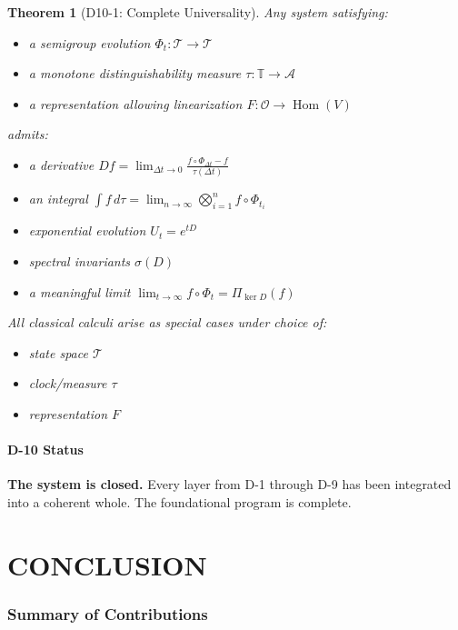 \documentclass[12pt, oneside]{article}
\newtheorem{theorem}{Theorem}[section]
\DeclareMathOperator{\Hom}{Hom}
\newcommand{\A}{\mathcal{A}}
\newcommand{\T}{\mathcal{T}}
\newcommand{\Opr}{\mathcal{O}}
\begin{document}
\begin{theorem}[D10-1: Complete Universality]
Any system satisfying:
\begin{itemize}
    \item a semigroup evolution $\Phi_t: \T \rightarrow \T$
    \item a monotone distinguishability measure $\tau: \mathbb{T} \rightarrow \A$
    \item a representation allowing linearization $F: \Opr \rightarrow \Hom(V)$
\end{itemize}
admits:
\begin{itemize}
    \item a derivative $Df = \lim_{\Delta t \rightarrow 0} \frac{f \circ \Phi_{\Delta t} - f}{\tau(\Delta t)}$
    \item an integral $\int f \, d\tau = \lim_{n \rightarrow \infty} \bigotimes_{i=1}^n f \circ \Phi_{t_i}$
    \item exponential evolution $U_t = e^{tD}$
    \item spectral invariants $\sigma(D)$
    \item a meaningful limit $\lim_{t \rightarrow \infty} f \circ \Phi_t = \Pi_{\ker D}(f)$
\end{itemize}

All classical calculi arise as special cases under choice of:
\begin{itemize}
    \item state space $\T$
    \item clock/measure $\tau$
    \item representation $F$
\end{itemize}
\end{theorem}

\subsection{D-10 Status}

\textbf{The system is closed.} Every layer from D-1 through D-9 has been integrated into a coherent whole. The foundational program is complete.

\newpage

\part{CONCLUSION}

\section{Summary of Contributions}
\end{document}
